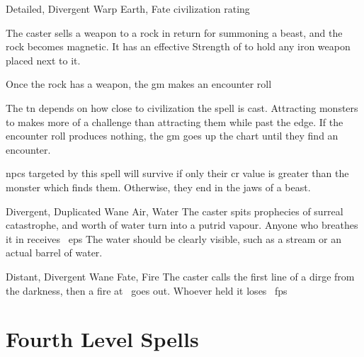 \begin{multicols}{2}
  {Detailed, Divergent}%
  {Warp}%
  {Earth, Fate}%
  {civilization rating}%
  {The caster sells a weapon to a rock in return for summoning a beast, and the rock becomes magnetic.
  It has an effective Strength of  to hold any iron weapon placed next to it.

  Once the rock has a weapon, the \gls{gm} makes an encounter roll}%
  {
    The \gls{tn} depends on how close to civilization the spell is cast.
    Attracting monsters to  makes more of a challenge than attracting them while past the \gls{edge}.%
    If the encounter roll produces nothing, the \gls{gm} goes up the chart until they find an encounter.

    \Glspl{npc} targeted by this spell will survive if only their \gls{cr} value is greater than the monster which finds them.
    Otherwise, they end in the jaws of a beast.
  }

  {Divergent, Duplicated}%
  {Wane}%
  {Air, Water}%
  {}%
  {The caster spits prophecies of surreal catastrophe, and  worth of water turn into a putrid vapour.
  Anyone who breathes it in receives ~\glspl{ep}}%
  {
    The water should be clearly visible, such as a stream or an actual barrel of water.}

  {Distant, Divergent}%
  {Wane}%
  {Fate, Fire}%
  {}%
  {The caster calls the first line of a dirge from the darkness, then a fire at \spellRange\ goes out.
  Whoever held it loses \showDam~\glspl{fp}}%
  {}


\end{multicols}

\filbreak
\section{Fourth Level Spells}


